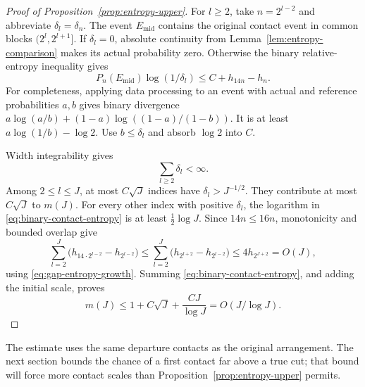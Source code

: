 \begin{proof}[Proof of Proposition~\ref{prop:entropy-upper}]
For $l\ge2$, take $n=2^{l-2}$ and abbreviate $\delta_l=\delta_n$.
The event $E_{\mathrm{mid}}$ contains the original contact event in
common blocks $(2^l,2^{l+1}]$.  If $\delta_l=0$, absolute continuity
from Lemma~\ref{lem:entropy-comparison} makes its actual probability
zero.  Otherwise the binary relative-entropy inequality gives
\begin{equation}\label{eq:binary-contact-entropy}
 P_n(E_{\mathrm{mid}})\log(1/\delta_l)
 \le C+h_{14n}-h_n.
\end{equation}
For completeness, applying data processing to an event with actual
and reference probabilities $a,b$ gives binary divergence
$a\log(a/b)+(1-a)\log((1-a)/(1-b))$.  It is at least
$a\log(1/b)-\log2$.  Use $b\le\delta_l$ and absorb $\log2$ into $C$.

Width integrability gives
\[
 \sum_{l\ge2}\delta_l<\infty.
\]
Among $2\le l\le J$, at most $C\sqrt J$ indices have
$\delta_l>J^{-1/2}$.  They contribute at most $C\sqrt J$ to $m(J)$.
For every other index with positive $\delta_l$, the logarithm in
\eqref{eq:binary-contact-entropy} is at least $\tfrac12\log J$.
Since $14n\le16n$, monotonicity and bounded overlap give
\[
 \sum_{l=2}^J\bigl(h_{14\cdot2^{l-2}}-h_{2^{l-2}}\bigr)
 \le\sum_{l=2}^J\bigl(h_{2^{l+2}}-h_{2^{l-2}}\bigr)
 \le4h_{2^{J+2}}=O(J),
\]
using \eqref{eq:gap-entropy-growth}.  Summing
\eqref{eq:binary-contact-entropy}, and adding the initial scale, proves
\[
 m(J)\le1+C\sqrt J+\frac{CJ}{\log J}
       =O(J/\log J).
\]
\end{proof}

The estimate uses the same departure contacts as the original
arrangement.  The next section bounds the chance of a first contact
far above a true cut; that bound will force more contact scales than
Proposition~\ref{prop:entropy-upper} permits.
